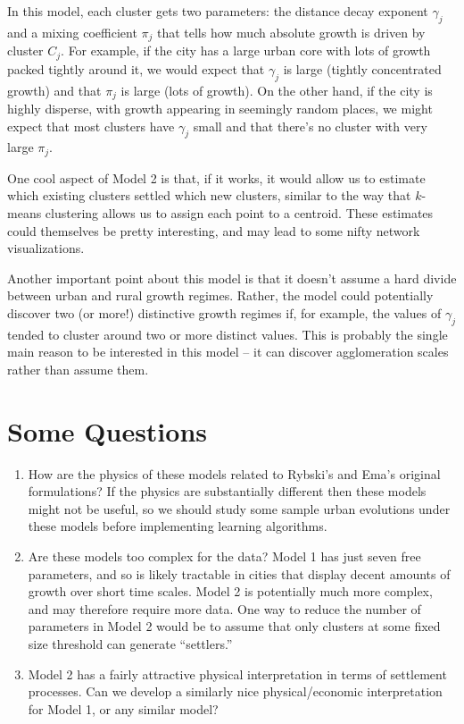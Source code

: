 \documentclass[english]{scrartcl}
\begin{document}
		In this model, each cluster gets two parameters: the distance decay exponent $\gamma_j$ and a mixing coefficient $\pi_j$ that tells how much absolute growth is driven by cluster $C_j$. 
		For example, if the city has a large urban core with lots of growth packed tightly around it, we would expect that $\gamma_j$ is large (tightly concentrated growth) and that $\pi_j$ is large (lots of growth). 
		On the other hand, if the city is highly disperse, with growth appearing in seemingly random places, we might expect that most clusters have $\gamma_j$ small and that there's no cluster with very large $\pi_j$. 

		One cool aspect of Model 2 is that, if it works, it would allow us to estimate which existing clusters settled which new clusters, similar to the way that $k$-means clustering allows us to assign each point to a centroid. 
		These estimates could themselves be pretty interesting, and may lead to some nifty network visualizations. 

		Another important point about this model is that it doesn't assume a hard divide between urban and rural growth regimes. 
		Rather, the model could potentially discover two (or more!) distinctive growth regimes if, for example, the values of $\gamma_j$ tended to cluster around two or more distinct values. 
		This is probably the single main reason to be interested in this model -- it can discover agglomeration scales rather than assume them. 

\section{Some Questions}
	\begin{enumerate}
		\item How are the physics of these models related to Rybski's and Ema's original formulations? If the physics are substantially different then these models might not be useful, so we should study some sample urban evolutions under these models before implementing learning algorithms. 
		\item Are these models too complex for the data? Model 1 has just seven free parameters, and so is likely tractable in cities that display decent amounts of growth over short time scales. Model 2 is potentially much more complex, and may therefore require more data. One way to reduce the number of parameters in Model 2 would be to assume that only clusters at some fixed size threshold can generate ``settlers.''
		\item Model 2 has a fairly attractive physical interpretation in terms of settlement processes. Can we develop a similarly nice physical/economic interpretation for Model 1, or any similar model? 
	\end{enumerate}


{}

\end{document}
